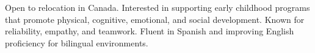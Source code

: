 \begin{cvparagraph}

  Open to relocation in Canada. Interested in supporting early childhood programs that promote physical, cognitive, emotional, and social development. Known for reliability, empathy, and teamwork. Fluent in Spanish and improving English proficiency for bilingual environments.

\end{cvparagraph}
